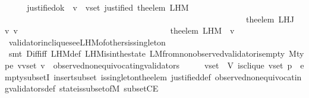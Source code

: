 \begin{isabellebody}
\ \ \isamarkupfalse%
\ \isamarkupfalse%
\ justified{\isacharunderscore}ok{\isacharcolon}\ {\isachardoublequoteopen}{\isasymforall}\ v\ {\isasymin}\ v{\isacharunderscore}set{\isachardot}\ justified\ {\isacharparenleft}the{\isacharunderscore}elem\ {\isacharparenleft}L{\isacharunderscore}H{\isacharunderscore}M\ \isanewline
\ \ \ \ \ \ \ \ \ \ \ \ \ \ \ \ \ \ \ \ \ \ \ \ \ \ \ \ \ \ \ \ \ \ \ \ \ \ \ \ \ \ \ \ \ \ \ \ \ \ \ \ \ \ \ \ \ \ {\isacharparenleft}the{\isacharunderscore}elem\ {\isacharparenleft}L{\isacharunderscore}H{\isacharunderscore}J\ {\isasymsigma}\ v{\isacharparenright}{\isacharparenright}\ v{\isacharparenright}{\isacharparenright}\isanewline
\ \ \ \ \ \ \ \ \ \ \ \ \ \ \ \ \ \ \ \ \ \ \ \ \ \ \ \ \ \ \ \ \ \ \ \ {\isacharparenleft}the{\isacharunderscore}elem\ {\isacharparenleft}L{\isacharunderscore}H{\isacharunderscore}M\ {\isasymsigma}\ v{\isacharparenright}{\isacharparenright}{\isachardoublequoteclose}\isanewline
\ \ \ \ \isamarkupfalse%
\ validator{\isacharunderscore}in{\isacharunderscore}clique{\isacharunderscore}see{\isacharunderscore}L{\isacharunderscore}H{\isacharunderscore}M{\isacharunderscore}of{\isacharunderscore}others{\isacharunderscore}is{\isacharunderscore}singleton\isanewline
\ \ \ \ \isamarkupfalse%
\ {\isacharparenleft}smt\ Diff{\isacharunderscore}iff\ L{\isacharunderscore}H{\isacharunderscore}M{\isacharunderscore}def\ L{\isacharunderscore}H{\isacharunderscore}M{\isacharunderscore}is{\isacharunderscore}in{\isacharunderscore}the{\isacharunderscore}state\ L{\isacharunderscore}M{\isacharunderscore}from{\isacharunderscore}non{\isacharunderscore}observed{\isacharunderscore}validator{\isacharunderscore}is{\isacharunderscore}empty\ M{\isacharunderscore}type\ {\isacartoucheopen}{\isasymforall}v{\isasymin}v{\isacharunderscore}set{\isachardot}\ v\ {\isasymin}\ observed{\isacharunderscore}non{\isacharunderscore}equivocating{\isacharunderscore}validators\ {\isasymsigma}{\isacartoucheclose}\ {\isacartoucheopen}{\isasymsigma}\ {\isasymin}\ {\isasymSigma}\ {\isasymand}\ v{\isacharunderscore}set\ {\isasymsubseteq}\ V{\isacartoucheclose}\ {\isacartoucheopen}is{\isacharunderscore}clique\ {\isacharparenleft}v{\isacharunderscore}set{\isacharcomma}\ p{\isacharcomma}\ {\isasymsigma}{\isacharparenright}{\isacartoucheclose}\ empty{\isacharunderscore}subsetI\ insert{\isacharunderscore}subset\ is{\isacharunderscore}singleton{\isacharunderscore}the{\isacharunderscore}elem\ justified{\isacharunderscore}def\ observed{\isacharunderscore}non{\isacharunderscore}equivocating{\isacharunderscore}validators{\isacharunderscore}def\ state{\isacharunderscore}is{\isacharunderscore}subset{\isacharunderscore}of{\isacharunderscore}M\ subsetCE{\isacharparenright}\isanewline

\end{isabellebody}
